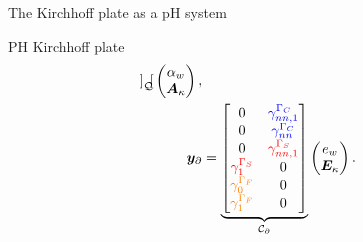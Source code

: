 \documentclass[aspectratio=169]{ISAE-Beamer}
\begin{document}
\begin{frame}{The Kirchhoff plate as a pH system}
\begin{block}{PH Kirchhoff plate}
\begin{equation*}
\begin{aligned}
{\begin{bmatrix}
		\end{bmatrix}}_{\mathcal{Q}}
		\begin{pmatrix}
		\alpha_w \\
		\bm{A}_{\kappa} \\
		\end{pmatrix}, \\
		\bm{y}_\partial &= \underbrace{
			\begin{bmatrix}
			{0} & \textcolor{blue}{\gamma_{nn, 1}^{\Gamma_C}} \\
			{0} & \textcolor{blue}{\gamma_{nn}^{\Gamma_C}} \\
			{0} & \textcolor{red}{\gamma_{nn, 1}^{\Gamma_S}} \\
			\textcolor{red}{\gamma_{1}^{\Gamma_S}} & {0} \\
			\textcolor{orange}{\gamma_{0}^{\Gamma_F}} & {0} \\
			\textcolor{orange}{\gamma_{1}^{\Gamma_F}} & {0} \\
			\end{bmatrix}}_{\mathcal{C}_\partial}
		\begin{pmatrix}
		e_w \\
		\bm{E}_{\kappa} \\
		\end{pmatrix}.
		\end{aligned}
		\end{equation*}
	\end{block}
\end{frame}
\end{document}
